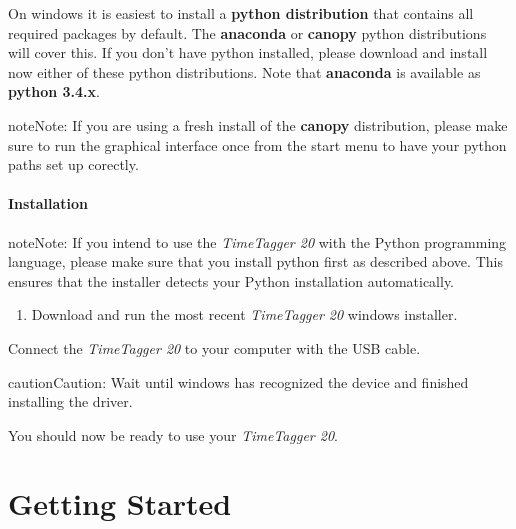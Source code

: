 \documentclass[letterpaper,10pt,english]{sphinxmanual}
\begin{document}
On windows it is easiest to install a \textbf{python distribution} that contains all required
packages by default. The \textbf{anaconda} or \textbf{canopy} python distributions will cover this.
If you don't have python installed, please download and install now either
of these python distributions. Note that \textbf{anaconda} is available as \textbf{python 3.4.x}.

\begin{notice}{note}{Note:}
If you are using a fresh install of the \textbf{canopy} distribution, please make sure to run the graphical interface once from the start menu to have your python paths set up corectly.
\end{notice}


\subsubsection{Installation}
\label{sections/installation:installation}
\begin{notice}{note}{Note:}
If you intend to use the \emph{TimeTagger 20} with the Python programming language, please make sure that you install python first as described above. This ensures that the installer detects your Python installation automatically.
\end{notice}
\begin{enumerate}
\item {} 
Download and run the most recent \emph{TimeTagger 20} windows installer.

\end{enumerate}

Connect the \emph{TimeTagger 20} to your computer with the USB cable.

\begin{notice}{caution}{Caution:}
Wait until windows has recognized the device and finished installing the driver.
\end{notice}

You should now be ready to use your \emph{TimeTagger 20}.


\chapter{Getting Started}
\label{sections/gettingStarted:getting-started}\label{sections/gettingStarted::doc}\label{sections/gettingStarted:quickstart}
\end{document}
